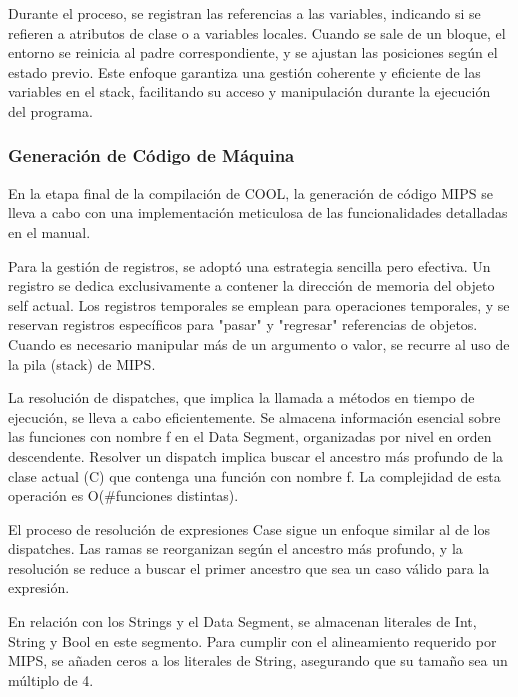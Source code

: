 \documentclass[10pt]{article} %
\begin{document}
	Durante el proceso, se registran las referencias a las variables, indicando si se refieren a atributos de clase o a variables locales. Cuando se sale de un bloque, el entorno se reinicia al padre correspondiente, y se ajustan las posiciones según el estado previo. Este enfoque garantiza una gestión coherente y eficiente de las variables en el stack, facilitando su acceso y manipulación durante la ejecución del programa.
	
	\subsubsection{Generaci\'on de C\'odigo de M\'aquina}

	En la etapa final de la compilación de COOL, la generación de código MIPS se lleva a cabo con una implementación meticulosa de las funcionalidades detalladas en el manual.
	
	Para la gestión de registros, se adoptó una estrategia sencilla pero efectiva. Un registro se dedica exclusivamente a contener la dirección de memoria del objeto self actual. Los registros temporales se emplean para operaciones temporales, y se reservan registros específicos para "pasar" y "regresar" referencias de objetos. Cuando es necesario manipular más de un argumento o valor, se recurre al uso de la pila (stack) de MIPS.
	
	La resolución de dispatches, que implica la llamada a métodos en tiempo de ejecución, se lleva a cabo eficientemente. Se almacena información esencial sobre las funciones con nombre f en el Data Segment, organizadas por nivel en orden descendente. Resolver un dispatch implica buscar el ancestro más profundo de la clase actual (C) que contenga una función con nombre f. La complejidad de esta operación es O(\#funciones distintas).
	
	El proceso de resolución de expresiones Case sigue un enfoque similar al de los dispatches. Las ramas se reorganizan según el ancestro más profundo, y la resolución se reduce a buscar el primer ancestro que sea un caso válido para la expresión.
	
	En relación con los Strings y el Data Segment, se almacenan literales de Int, String y Bool en este segmento. Para cumplir con el alineamiento requerido por MIPS, se añaden ceros a los literales de String, asegurando que su tamaño sea un múltiplo de 4.
	
\end{document}

